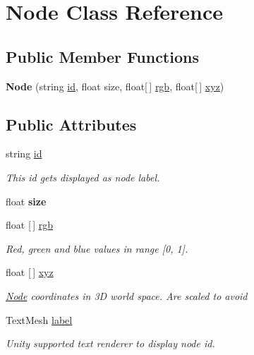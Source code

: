 \hypertarget{class_node}{}\section{Node Class Reference}
\label{class_node}
\subsection*{Public Member Functions}
\begin{DoxyCompactItemize}
\item 
\mbox{\label{class_node_a1be4781de976eb004c3bb5ae9dc5d936}} 
{\bfseries Node} (string \mbox{\hyperlink{class_node_aac01078adae41d418df6d5e92e19093f}{id}}, float size, float\mbox{[}$\,$\mbox{]} \mbox{\hyperlink{class_node_a72369fbc3dfe1c11ebef2d447454e0a6}{rgb}}, float\mbox{[}$\,$\mbox{]} \mbox{\hyperlink{class_node_af9ab567cc411e1883e8466db9cca5bbc}{xyz}})
\end{DoxyCompactItemize}
\subsection*{Public Attributes}
\begin{DoxyCompactItemize}
\item 
string \mbox{\hyperlink{class_node_aac01078adae41d418df6d5e92e19093f}{id}}
\begin{DoxyCompactList}\small\item\em This id gets displayed as node label. \end{DoxyCompactList}\item 
\mbox{\label{class_node_ab6a4565b8299b37b355070f40d686173}} 
float {\bfseries size}
\item 
float \mbox{[}$\,$\mbox{]} \mbox{\hyperlink{class_node_a72369fbc3dfe1c11ebef2d447454e0a6}{rgb}}
\begin{DoxyCompactList}\small\item\em Red, green and blue values in range \mbox{[}0, 1\mbox{]}. \end{DoxyCompactList}\item 
float \mbox{[}$\,$\mbox{]} \mbox{\hyperlink{class_node_af9ab567cc411e1883e8466db9cca5bbc}{xyz}}
\begin{DoxyCompactList}\small\item\em \mbox{\hyperlink{class_node}{Node}} coordinates in 3D world space. Are scaled to avoid \end{DoxyCompactList}\item 
Text\+Mesh \mbox{\hyperlink{class_node_a6529bbce9a0d3a42b5738b7f338ff129}{label}}
\begin{DoxyCompactList}\small\item\em Unity supported text renderer to display node id. \end{DoxyCompactList}\end{DoxyCompactItemize}


